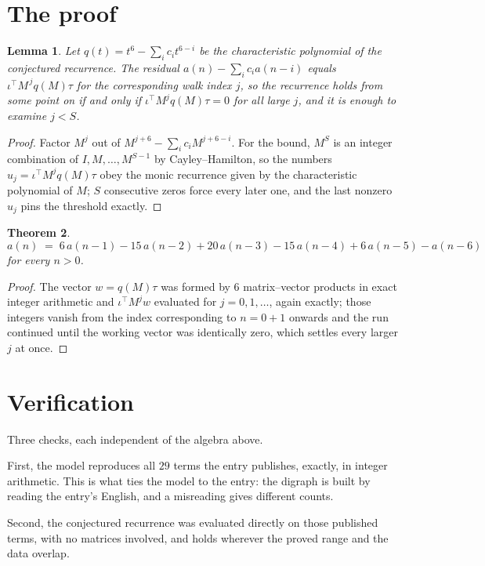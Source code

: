 \documentclass[11pt,a4paper]{article}
\theoremstyle{plain}
\newtheorem{theorem}{Theorem}
\newtheorem{lemma}[theorem]{Lemma}
\theoremstyle{definition}
\begin{document}
\section{The proof}

\begin{lemma}\label{lem:crit}
Let $q(t)=t^{6}-\sum_i c_it^{6-i}$ be the characteristic polynomial of the
conjectured recurrence. The residual $a(n)-\sum_ic_ia(n-i)$ equals
$\iota^{\!\top}M^{\,j}q(M)\tau$ for the corresponding walk index $j$, so the recurrence
holds from some point on if and only if $\iota^{\!\top}M^{j}q(M)\tau=0$ for all large $j$,
and it is enough to examine $j<S$.
\end{lemma}

\begin{proof}
Factor $M^{j}$ out of $M^{j+6}-\sum_ic_iM^{j+6-i}$. For the bound, $M^{S}$
is an integer combination of $I,M,\dots,M^{S-1}$ by Cayley--Hamilton, so the numbers
$u_j=\iota^{\!\top}M^{j}q(M)\tau$ obey the monic recurrence given by the characteristic
polynomial of $M$; $S$ consecutive zeros force every later one, and the last nonzero $u_j$
pins the threshold exactly.
\end{proof}

\begin{theorem}
\[
a(n)\;=\;6\,a(n-1) - 15\,a(n-2) + 20\,a(n-3) - 15\,a(n-4) + 6\,a(n-5) - a(n-6)
\]
for every $n>0$.
\end{theorem}

\begin{proof}
The vector $w=q(M)\tau$ was formed by $6$ matrix--vector products in exact integer
arithmetic and $\iota^{\!\top}M^{j}w$ evaluated for $j=0,1,\dots$, again exactly; those
integers vanish from the index corresponding to $n=0+1$ onwards and the run continued
until the working vector was identically zero, which settles every larger $j$ at once.
\end{proof}

\section{Verification}

Three checks, each independent of the algebra above.

First, the model reproduces all $29$ terms the entry publishes, exactly, in integer
arithmetic. This is what ties the model to the entry: the digraph is built by reading the
entry's English, and a misreading gives different counts.

Second, the conjectured recurrence was evaluated directly on those published terms, with no
matrices involved, and holds wherever the proved range and the data overlap.
\end{document}
